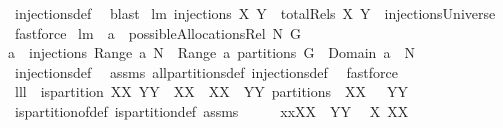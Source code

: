 \begin{isabellebody}
%
\isatagproof
{}\isamarkupfalse%
\ injections{\isacharunderscore}def\ \isamarkupfalse%
\ blast%
\endisatagproof
{\isafoldproof}%
%
\isadelimproof
%
\endisadelimproof
\isanewline
{}\isamarkupfalse%
\ lm{}{}{\isacharcolon}\ {\isachardoublequoteopen}injections{\isacharprime}\ X\ Y\ {\isacharequal}\ totalRels\ X\ Y\ {\isasyminter}\ injectionsUniverse{\isachardoublequoteclose}%
\isadelimproof
\ %
\endisadelimproof
%
\isatagproof
{}\isamarkupfalse%
\ fastforce%
\endisatagproof
{\isafoldproof}%
%
\isadelimproof
%
\endisadelimproof
\isanewline
\isanewline
{}\isamarkupfalse%
\ lm{}{}{\isacharcolon}\ \ {\isachardoublequoteopen}a\ {\isasymin}\ possibleAllocationsRel\ N\ G{\isachardoublequoteclose}\ \ \isanewline
{\isachardoublequoteopen}a{\isacharcircum}{\isacharminus}{}\ {\isasymin}\ injections\ {\isacharparenleft}Range\ a{\isacharparenright}\ N\ {\isacharampersand}\ Range\ a\ partitions\ G\ {\isacharampersand}\ Domain\ a\ {\isasymsubseteq}\ N{\isachardoublequoteclose}\ \isanewline
%
\isadelimproof
%
\endisadelimproof
%
\isatagproof
{}\isamarkupfalse%
\ injections{\isacharunderscore}def\ \isamarkupfalse%
\ assms\ all{\isacharunderscore}partitions{\isacharunderscore}def\ injections{\isacharunderscore}def\ \isamarkupfalse%
\ fastforce%
\endisatagproof
{\isafoldproof}%
%
\isadelimproof
\isanewline
%
\endisadelimproof
\isanewline
{}\isamarkupfalse%
\ lll{}{}{\isacharcolon}\ \ {\isachardoublequoteopen}is{\isacharunderscore}partition\ XX{\isachardoublequoteclose}\ {\isachardoublequoteopen}YY\ {\isasymsubseteq}\ XX{\isachardoublequoteclose}\ \ {\isachardoublequoteopen}{\isacharparenleft}XX\ {\isacharminus}\ YY{\isacharparenright}\ partitions\ {\isacharparenleft}{\isasymUnion}\ XX\ {\isacharminus}\ {\isasymUnion}\ YY{\isacharparenright}{\isachardoublequoteclose}\isanewline
%
\isadelimproof
%
\endisadelimproof
%
\isatagproof
{}\isamarkupfalse%
\ is{\isacharunderscore}partition{\isacharunderscore}of{\isacharunderscore}def\ is{\isacharunderscore}partition{\isacharunderscore}def\ assms\isanewline
{}\isamarkupfalse%
\ {\isacharminus}\isanewline
\ \ \isamarkupfalse%
\ {\isacharquery}xx{\isacharequal}{\isachardoublequoteopen}XX\ {\isacharminus}\ YY{\isachardoublequoteclose}\ \isamarkupfalse%
\ {\isacharquery}X{\isacharequal}{\isachardoublequoteopen}{\isasymUnion}\ XX{\isachardoublequoteclose}\ \isamarkupfalse%

\end{isabellebody}
